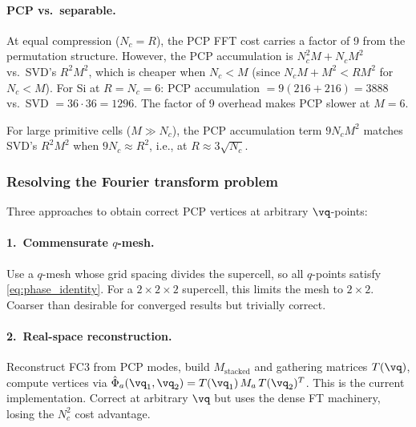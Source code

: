 \paragraph{PCP vs.\ separable.}
At equal compression ($N_c = R$), the PCP FFT cost carries a
factor of 9 from the permutation structure.  However, the PCP
accumulation is $N_c^2 M + N_c M^2$ vs.\ SVD's $R^2 M^2$, which
is cheaper when $N_c < M$ (since $N_c M + M^2 < R M^2$ for
$N_c < M$).  For Si at $R = N_c = 6$: PCP accumulation
$= 9(216 + 216) = 3888$ vs.\ SVD $= 36 \cdot 36 = 1296$.  The
factor of 9 overhead makes PCP slower at $M = 6$.

For large primitive cells ($M \gg N_c$), the PCP accumulation
term $9 N_c M^2$ matches SVD's $R^2 M^2$ when $9 N_c \approx R^2$,
i.e., at $R \approx 3\sqrt{N_c}$.


\subsubsection{Resolving the Fourier transform problem}
\label{sssub:ft_resolution}

Three approaches to obtain correct PCP vertices at arbitrary
$\vq$-points:

\paragraph{1.\ Commensurate $q$-mesh.}
Use a $q$-mesh whose grid spacing divides the supercell, so all
$q$-points satisfy \cref{eq:phase_identity}.  For a $2\times2\times2$
supercell, this limits the mesh to $2\times2$.  Coarser than
desirable for converged results but trivially correct.

\paragraph{2.\ Real-space reconstruction.}
Reconstruct FC3 from PCP modes, build $M_\mathrm{stacked}$ and
gathering matrices $T(\vq)$, compute vertices via
$\hat\Phi_a(\vq_1,\vq_2) = T(\vq_1)\,M_a\,T(\vq_2)^T$.  This is
the current implementation.  Correct at arbitrary $\vq$ but uses
the dense FT machinery, losing the $N_c^2$ cost advantage.

